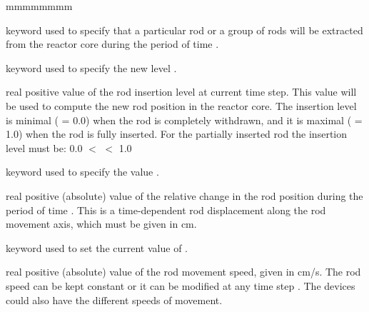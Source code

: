 \begin{ListeDeDescription}{mmmmmmmm}
\item[\moc{EXTR}] keyword used to specify that a particular rod or a
group of rods will be extracted from the reactor core during the period
of time .

\item[\moc{LEVEL}] keyword used to specify the new level .

\item[\dusa{value}] real positive value of the rod insertion level at current
time step. This value will be used to compute the new rod position in the
reactor core. The insertion level is minimal ( = 0.0) when the
rod is completely withdrawn, and it is maximal ( = 1.0) when
the rod is fully inserted. For the partially inserted rod the insertion level
must be: 0.0 $<$  $<$ 1.0

\item[\moc{DELH}] keyword used to specify the value .

\item[\dusa{delh}] real positive (absolute) value of the relative change in the
rod position during the period of time . This is a time-dependent
rod displacement along the rod movement axis, which must be given in cm.

\item[\moc{SPEED}] keyword used to set the current value of .

\item[\dusa{speed}] real positive (absolute) value of the rod movement
speed, given in cm/s. The rod speed can be kept constant or it can be
modified at any time step . The devices could also have the
different speeds of movement.

\end{ListeDeDescription}
\clearpage
